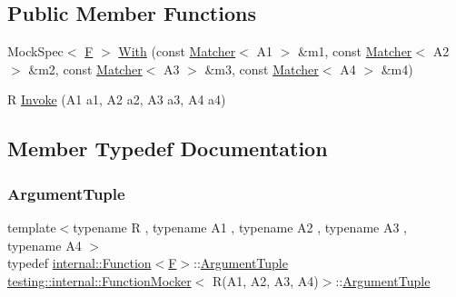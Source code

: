 \subsection*{Public Member Functions}
\begin{DoxyCompactItemize}
\item 
Mock\+Spec$<$ \mbox{\hyperlink{classtesting_1_1internal_1_1FunctionMocker_3_01R_07A1_00_01A2_00_01A3_00_01A4_08_4_a9be04bb962edb1458c857ca8e9db9318}{F}} $>$ \mbox{\hyperlink{classtesting_1_1internal_1_1FunctionMocker_3_01R_07A1_00_01A2_00_01A3_00_01A4_08_4_aee6e908e8409a52c44d3a8abd2bead99}{With}} (const \mbox{\hyperlink{classtesting_1_1Matcher}{Matcher}}$<$ A1 $>$ \&m1, const \mbox{\hyperlink{classtesting_1_1Matcher}{Matcher}}$<$ A2 $>$ \&m2, const \mbox{\hyperlink{classtesting_1_1Matcher}{Matcher}}$<$ A3 $>$ \&m3, const \mbox{\hyperlink{classtesting_1_1Matcher}{Matcher}}$<$ A4 $>$ \&m4)
\item 
R \mbox{\hyperlink{classtesting_1_1internal_1_1FunctionMocker_3_01R_07A1_00_01A2_00_01A3_00_01A4_08_4_ac20228ed7a21f43775a08fb3b1661721}{Invoke}} (A1 a1, A2 a2, A3 a3, A4 a4)
\end{DoxyCompactItemize}


\subsection{Member Typedef Documentation}
\mbox{\label{classtesting_1_1internal_1_1FunctionMocker_3_01R_07A1_00_01A2_00_01A3_00_01A4_08_4_a97576d71dfe85cbb0fc51fcaad6d4cc1}} 
\subsubsection{\texorpdfstring{ArgumentTuple}{ArgumentTuple}}
{\footnotesize\ttfamily template$<$typename R , typename A1 , typename A2 , typename A3 , typename A4 $>$ \\
typedef \mbox{\hyperlink{structtesting_1_1internal_1_1Function}{internal\+::\+Function}}$<$\mbox{\hyperlink{classtesting_1_1internal_1_1FunctionMocker_3_01R_07A1_00_01A2_00_01A3_00_01A4_08_4_a9be04bb962edb1458c857ca8e9db9318}{F}}$>$\+::\mbox{\hyperlink{classtesting_1_1internal_1_1FunctionMocker_3_01R_07A1_00_01A2_00_01A3_00_01A4_08_4_a97576d71dfe85cbb0fc51fcaad6d4cc1}{Argument\+Tuple}} \mbox{\hyperlink{classtesting_1_1internal_1_1FunctionMocker}{testing\+::internal\+::\+Function\+Mocker}}$<$ R(A1, A2, A3, A4)$>$\+::\mbox{\hyperlink{classtesting_1_1internal_1_1FunctionMocker_3_01R_07A1_00_01A2_00_01A3_00_01A4_08_4_a97576d71dfe85cbb0fc51fcaad6d4cc1}{Argument\+Tuple}}}

